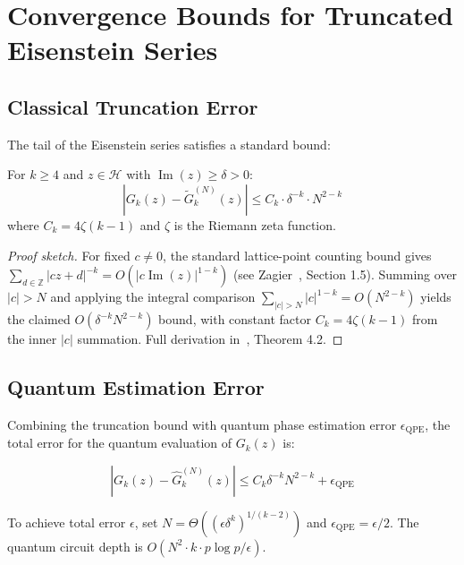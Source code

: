 \section{Convergence Bounds for Truncated Eisenstein Series}


\subsection{Classical Truncation Error}

The tail of the Eisenstein series satisfies a standard bound:

\begin{theorem}\label{thm:truncation}
For $k \geq 4$ and $z \in \mathcal{H}$ with
$\operatorname{Im}(z) \geq \delta > 0$:
\[
\left| G_k(z) - \tilde{G}_k^{(N)}(z) \right|
\leq C_k \cdot \delta^{-k} \cdot N^{2-k}
\]
where $C_k = 4\zeta(k-1)$ and $\zeta$ is the Riemann zeta function.
\end{theorem}

\begin{proof}[Proof sketch]
For fixed $c \neq 0$, the standard lattice-point counting bound
gives $\sum_{d \in \mathbb{Z}} |cz+d|^{-k}
   = O\!\left( |c \operatorname{Im}(z)|^{1-k} \right)$
(see Zagier~\cite{zagier2008}, Section 1.5). Summing over $|c| > N$
and applying the integral comparison
$\sum_{|c|>N} |c|^{1-k} = O(N^{2-k})$
yields the claimed $O(\delta^{-k} N^{2-k})$ bound, with constant
factor $C_k = 4\zeta(k-1)$ from the inner $|c|$ summation. Full
derivation in~\cite{zagier2008}, Theorem 4.2.
\end{proof}

\subsection{Quantum Estimation Error}

Combining the truncation bound with quantum phase estimation error
$\epsilon_{\mathrm{QPE}}$, the total error for the quantum evaluation
of $G_k(z)$ is:

\begin{equation}\label{eq:total-error}
\left| G_k(z) - \hat{G}_k^{(N)}(z) \right|
\leq C_k \delta^{-k} N^{2-k} + \epsilon_{\mathrm{QPE}}
\end{equation}

To achieve total error $\epsilon$, set $N = \Theta((\epsilon
\delta^k)^{1/(k-2)})$ and $\epsilon_{\mathrm{QPE}} = \epsilon/2$.
The quantum circuit depth is
$O(N^2 \cdot k \cdot p \log p / \epsilon)$.

